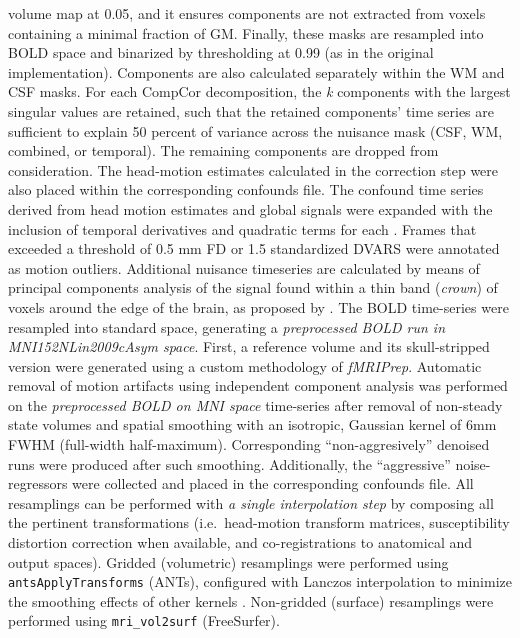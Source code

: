 \documentclass[
]{article}
\begin{document}
\begin{description}
volume map at 0.05, and it ensures components are not extracted from
voxels containing a minimal fraction of GM. Finally, these masks are
resampled into BOLD space and binarized by thresholding at 0.99 (as in
the original implementation). Components are also calculated separately
within the WM and CSF masks. For each CompCor decomposition, the
\emph{k} components with the largest singular values are retained, such
that the retained components' time series are sufficient to explain 50
percent of variance across the nuisance mask (CSF, WM, combined, or
temporal). The remaining components are dropped from consideration. The
head-motion estimates calculated in the correction step were also placed
within the corresponding confounds file. The confound time series
derived from head motion estimates and global signals were expanded with
the inclusion of temporal derivatives and quadratic terms for each
\citep{confounds_satterthwaite_2013}. Frames that exceeded a threshold
of 0.5 mm FD or 1.5 standardized DVARS were annotated as motion
outliers. Additional nuisance timeseries are calculated by means of
principal components analysis of the signal found within a thin band
(\emph{crown}) of voxels around the edge of the brain, as proposed by
\citep{patriat_improved_2017}. The BOLD time-series were resampled into
standard space, generating a \emph{preprocessed BOLD run in
MNI152NLin2009cAsym space}. First, a reference volume and its
skull-stripped version were generated using a custom methodology of
\emph{fMRIPrep}. Automatic removal of motion artifacts using independent
component analysis \citep[ICA-AROMA,][]{aroma} was performed on the
\emph{preprocessed BOLD on MNI space} time-series after removal of
non-steady state volumes and spatial smoothing with an isotropic,
Gaussian kernel of 6mm FWHM (full-width half-maximum). Corresponding
``non-aggresively'' denoised runs were produced after such smoothing.
Additionally, the ``aggressive'' noise-regressors were collected and
placed in the corresponding confounds file. All resamplings can be
performed with \emph{a single interpolation step} by composing all the
pertinent transformations (i.e.~head-motion transform matrices,
susceptibility distortion correction when available, and
co-registrations to anatomical and output spaces). Gridded (volumetric)
resamplings were performed using \texttt{antsApplyTransforms} (ANTs),
configured with Lanczos interpolation to minimize the smoothing effects
of other kernels \citep{lanczos}. Non-gridded (surface) resamplings were
performed using \texttt{mri\_vol2surf} (FreeSurfer).
\end{description}
\end{document}
